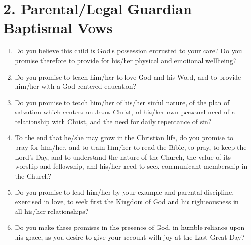 \section[2. Parental/Legal Guardian Baptismal Vows]{2. Parental/Legal Guardian Baptismal Vows} 

\begin{enumerate} 
  \item Do you believe this child is God's possession entrusted to your care? Do you promise therefore to provide for his/her physical and emotional wellbeing? 
  \item Do you promise to teach him/her to love God and his Word, and to provide him/her with a God-centered education? 
  \item Do you promise to teach him/her of his/her sinful nature, of the plan of salvation which centers on Jesus Christ, of his/her own personal need of a relationship with Christ, and the need for daily repentance of sin? 
  \item To the end that he/she may grow in the Christian life, do you promise to pray for him/her, and to train him/her to read the Bible, to pray, to keep the Lord's Day, and to understand the nature of the Church, the value of its worship and fellowship, and his/her need to seek communicant membership in the Church? 
  \item Do you promise to lead him/her by your example and parental discipline, exercised in love, to seek first the Kingdom of God and his righteousness in all his/her relationships? 
  \item Do you make these promises in the presence of God, in humble reliance upon his grace, as you desire to give your account with joy at the Last Great Day?
\end{enumerate}

